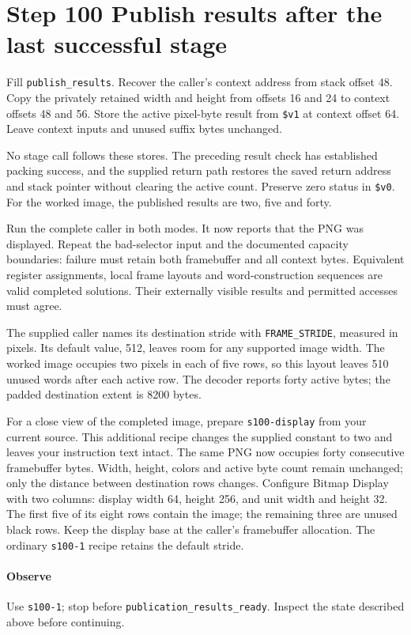 \section{Step 100 Publish results after the last successful stage}
Fill \texttt{publish\_results}. Recover the caller’s context address from stack offset 48. Copy the privately retained width and height from offsets 16 and 24 to context offsets 48 and 56. Store the active pixel-byte result from \texttt{\$v1} at context offset 64. Leave context inputs and unused suffix bytes unchanged.

No stage call follows these stores. The preceding result check has established packing success, and the supplied return path restores the saved return address and stack pointer without clearing the active count. Preserve zero status in \texttt{\$v0}. For the worked image, the published results are two, five and forty.

Run the complete caller in both modes. It now reports that the PNG was displayed. Repeat the bad-selector input and the documented capacity boundaries: failure must retain both framebuffer and all context bytes. Equivalent register assignments, local frame layouts and word-construction sequences are valid completed solutions. Their externally visible results and permitted accesses must agree.

The supplied caller names its destination stride with \texttt{FRAME\_STRIDE},
measured in pixels. Its default value, 512, leaves room for any supported image
width. The worked image occupies two pixels in each of five rows, so this layout
leaves 510 unused words after each active row. The decoder reports forty active
bytes; the padded destination extent is 8200 bytes.

For a close view of the completed image, prepare \texttt{s100-display} from your
current source. This additional recipe changes the supplied constant to two and
leaves your instruction text intact. The same PNG now occupies forty consecutive
framebuffer bytes. Width, height, colors and active byte count remain unchanged;
only the distance between destination rows changes. Configure Bitmap Display with
two columns: display width 64, height 256, and unit width and height 32. The first
five of its eight rows contain the image; the remaining three are unused black
rows. Keep the display base at the caller's framebuffer allocation. The ordinary
\texttt{s100-1} recipe retains the default stride.

\paragraph{Observe} Use \texttt{s100-1}; stop before \texttt{publication\_results\_ready}. Inspect the state described above before continuing.

